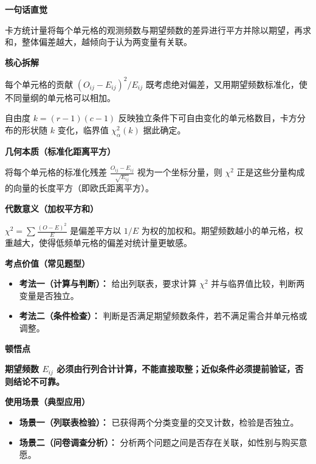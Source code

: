 \begin{explanationbox}
	\textbf{\textcolor{CExplanation}{一句话直觉}}

	卡方统计量将每个单元格的观测频数与期望频数的差异进行平方并除以期望，再求和，整体偏差越大，越倾向于认为两变量有关联。

	\medskip
	\textbf{\textcolor{CExplanation}{核心拆解}}
	\begin{description}[style=nextline, leftmargin=2.8em, labelsep=0.5em, itemsep=0.45em]
		\item[\textbf{要点一（偏差平方标准化）：}] 每个单元格的贡献 $(O_{ij}-E_{ij})^2/E_{ij}$ 既考虑绝对偏差，又用期望频数标准化，使不同量纲的单元格可以相加。
		\item[\textbf{要点二（自由度决定临界值）：}] 自由度 $k=(r-1)(c-1)$ 反映独立条件下可自由变化的单元格数目，卡方分布的形状随 $k$ 变化，临界值 $\chi^2_\alpha(k)$ 据此确定。
	\end{description}

	\medskip
	\textbf{\textcolor{CExplanation}{几何本质（标准化距离平方）}}

	将每个单元格的标准化残差 $\frac{O_{ij}-E_{ij}}{\sqrt{E_{ij}}}$ 视为一个坐标分量，则 $\chi^2$ 正是这些分量构成的向量的长度平方（即欧氏距离平方）。

	\medskip
	\textbf{\textcolor{CExplanation}{代数意义（加权平方和）}}

	$\chi^2 = \sum \frac{(O-E)^2}{E}$ 是偏差平方以 $1/E$ 为权的加权和。期望频数越小的单元格，权重越大，使得低频单元格的偏差对统计量更敏感。

	\medskip
	\textbf{\textcolor{CExplanation}{考点价值（常见题型）}}
	\begin{itemize}[leftmargin=*, itemsep=0.5em, topsep=0.4em]
		\item \textbf{考法一（计算与判断）：} 给出列联表，要求计算 $\chi^2$ 并与临界值比较，判断两变量是否独立。
		\item \textbf{考法二（条件检查）：} 判断是否满足期望频数条件，若不满足需合并单元格或调整。
	\end{itemize}

	\medskip
	\textbf{\textcolor{CExplanation}{顿悟点}}

	\textbf{期望频数 $E_{ij}$ 必须由行列合计计算，不能直接取整；近似条件必须提前验证，否则结论不可靠。}

	\medskip
	\textbf{\textcolor{CExplanation}{使用场景（典型应用）}}
	\begin{itemize}[leftmargin=*, itemsep=0.5em, topsep=0.4em]
		\item \textbf{场景一（列联表检验）：} 已获得两个分类变量的交叉计数，检验是否独立。
		\item \textbf{场景二（问卷调查分析）：} 分析两个问题之间是否存在关联，如性别与购买意愿。
	\end{itemize}
\end{explanationbox}
